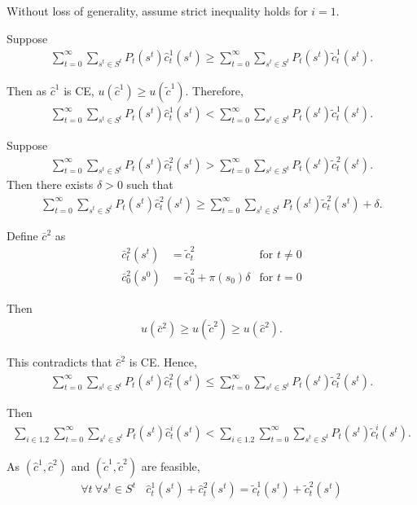 \documentclass{ltjsarticle}
\begin{document}
Without loss of generality, assume strict inequality holds for $i=1$.

Suppose
\begin{align*}
    \sum^{\infty}_{t=0} \sum_{s^t\in S^t} P_t(s^t) \hat{c}_t^1(s^t) \geq \sum^{\infty}_{t=0} \sum_{s^t\in S^t} P_t(s^t) \tilde{c}_t^1(s^t).
\end{align*}

Then as $\hat{c}^1$ is CE, $u(\hat{c}^1) \geq u(\tilde{c}^1)$. Therefore,
\begin{align*}
    \sum^{\infty}_{t=0} \sum_{s^t\in S^t} P_t(s^t) \hat{c}_t^1(s^t) < \sum^{\infty}_{t=0} \sum_{s^t\in S^t} P_t(s^t) \tilde{c}_t^1(s^t).
\end{align*}

Suppose
\begin{align*}
    \sum^{\infty}_{t=0} \sum_{s^t\in S^t} P_t(s^t) \hat{c}_t^2(s^t) > \sum^{\infty}_{t=0} \sum_{s^t\in S^t} P_t(s^t) \tilde{c}_t^2(s^t).
\end{align*}
Then there exists $\delta>0$ such that
\begin{align*}
    \sum^{\infty}_{t=0} \sum_{s^t\in S^t} P_t(s^t) \hat{c}_t^2(s^t) \geq \sum^{\infty}_{t=0} \sum_{s^t\in S^t} P_t(s^t) \tilde{c}_t^2(s^t) + \delta.
\end{align*}

Define $\bar{c}^2$ as
\begin{align*}
    \bar{c}^2_t(s^t) &= \tilde{c}^2_t &\text{for } t\neq 0\\
    \bar{c}^2_0(s^0) &= \tilde{c}^2_0+\pi(s_0)\delta &\text{for } t= 0
\end{align*}

Then
\begin{align*}
    u(\bar{c}^2) \geq u(\tilde{c}^2) \geq u(\hat{c}^2).
\end{align*}

This contradicts that $\hat{c}^2$ is CE.
Hence,
\begin{align*}
    \sum^{\infty}_{t=0} \sum_{s^t\in S^t} P_t(s^t) \hat{c}_t^2(s^t) \leq \sum^{\infty}_{t=0} \sum_{s^t\in S^t} P_t(s^t) \tilde{c}_t^2(s^t).
\end{align*}

Then
\begin{align*}
    \sum_{i\in \qty{1,2}}\sum^{\infty}_{t=0} \sum_{s^t\in S^t} P_t(s^t) \hat{c}_t^i(s^t) < \sum_{i\in \qty{1,2}}\sum^{\infty}_{t=0} \sum_{s^t\in S^t} P_t(s^t) \tilde{c}_t^i(s^t).
\end{align*}

As $(\hat{c}^1,\hat{c}^2)$ and $(\tilde{c}^1, \tilde{c}^2)$ are feasible,
\begin{align}
    \forall t\ \forall s^t\in S^t\ \ \ \  \hat{c}^1_t(s^t) + \hat{c}^2_t(s^t) = \tilde{c}^1_t(s^t) +\tilde{c}^2_t(s^t)
\end{align}
\end{document}
